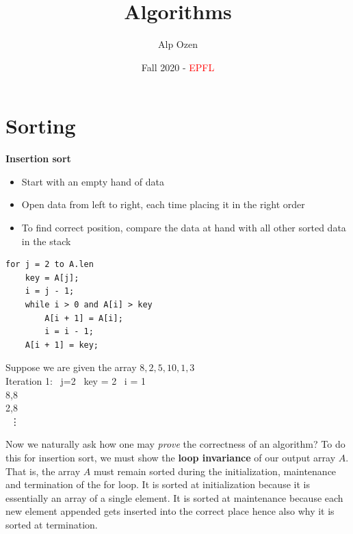 \documentclass[titlepage]{article}
\title{\textbf{Algorithms}}
\author{Alp Ozen}
\date{Fall 2020 - \textcolor{red}{EPFL}}
\numberwithin{equation}{subsection}
\begin{document}
\maketitle
\tableofcontents

\clearpage

\section{Sorting}

\textbf{Insertion sort}

\begin{tcolorbox}
\begin{itemize}
  \item Start with an empty hand of data
  \item Open data from left to right, each time placing it in the right order
  \item To find correct position, compare the data at hand with all other sorted data in the stack 
\end{itemize}
\end{tcolorbox}

\begin{cs}
\begin{verbatim}
for j = 2 to A.len
    key = A[j];
    i = j - 1; 
    while i > 0 and A[i] > key 
        A[i + 1] = A[i];
        i = i - 1;
    A[i + 1] = key;
\end{verbatim}

\end{cs}

\begin{example}
Suppose we are given the array $8,2,5,10,1,3$
\\

Iteration 1:
\
j=2 \ key = 2 \ i = 1
\\

8,8
\\

2,8
\\

\ \vdots
\end{example}

Now we naturally ask how one may \textit{prove} the correctness of an algorithm? To do this for insertion sort, we must show the \textbf{loop invariance} of our output array $A$. That is, the array $A$ must remain sorted during the initialization, maintenance and termination of the for loop. It is sorted at initialization because it is essentially an array of a single element. It is sorted at maintenance because each new element appended gets inserted into the correct place hence also why it is sorted at termination. 
\\
\end{document}
